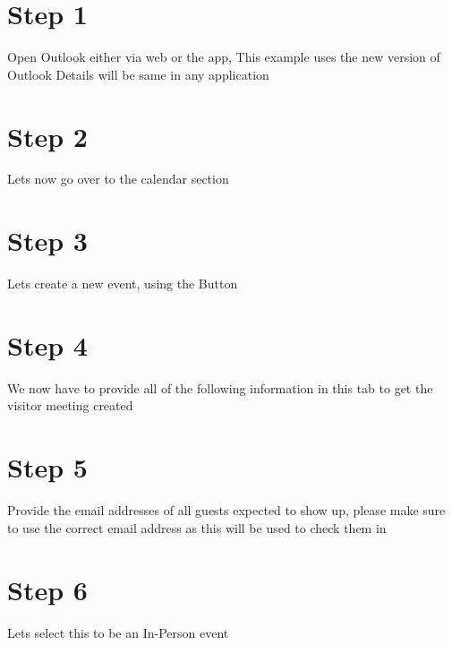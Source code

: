 \documentclass{../lib/lib-en}
\begin{document}

\newpage
\newpage
\section*{\centering Step 1}
Open Outlook either via web or the app, 
This example uses the new version of Outlook Details will be same in any application 


\newpage
\section*{\centering Step 2}
Lets now go over to the calendar section 


\newpage
\section*{\centering Step 3}
Lets create a new event, using the  Button


\newpage
\section*{\centering Step 4}
We now have to provide all of the following information in this tab to get the visitor meeting created


\newpage
\section*{\centering Step 5}
Provide the email addresses of all guests expected to show up, please make sure to use the correct email address as this will be used to check them in


\newpage
\section*{\centering Step 6}
Lets select this to be an In-Person event
\end{document}
